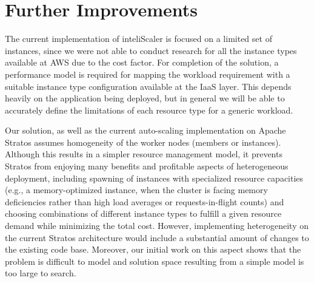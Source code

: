 \section{Further Improvements}
The current implementation of inteliScaler is focused on a limited set of instances, since we were not able to conduct research for all the instance types available at AWS due to the cost factor. For completion of the solution, a performance model is required for mapping the workload requirement with a suitable instance type configuration available at the IaaS layer. This depends heavily on the application being deployed, but in general we will be able to accurately define the limitations of each resource type for a generic workload.

Our solution, as well as the current auto-scaling implementation on Apache Stratos assumes homogeneity of the worker nodes (members or instances). Although this results in a simpler resource management model, it prevents Stratos from enjoying many benefits and profitable aspects of heterogeneous deployment, including spawning of instances with specialized resource capacities (e.g., a memory-optimized instance, when the cluster is facing memory deficiencies rather than high load averages or requests-in-flight counts) and choosing combinations of different instance types to fulfill a given resource demand while minimizing the total cost. However, implementing heterogeneity on the current Stratos architecture would include a substantial amount of changes to the existing code base. Moreover, our initial work on this aspect shows that the problem is difficult to model and solution space resulting from a simple model is too large to search.